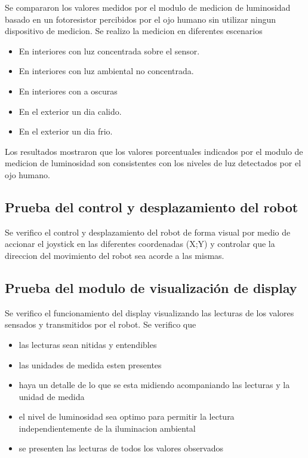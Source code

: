 Se compararon los valores medidos por el modulo de medicion de luminosidad basado en un fotoresistor percibidos por el ojo humano sin utilizar ningun dispositivo de medicion. Se realizo la medicion en diferentes escenarios

\begin{itemize}
	\item En interiores con luz concentrada sobre el sensor.
	\item En interiores con luz ambiental no concentrada.
	\item En interiores con a oscuras
	\item En el exterior un dia calido.
	\item En el exterior un dia frio.
\end{itemize}

Los resultados mostraron que los valores porcentuales indicados por el modulo de medicion de luminosidad son consistentes con los niveles de luz detectados por el ojo humano.

\subsection{Prueba del control y desplazamiento del robot}

Se verifico el control y desplazamiento del robot de forma visual por medio de accionar el joystick en las diferentes coordenadas (X;Y) y controlar que la direccion del movimiento del robot sea acorde a las mismas.


\subsection{Prueba del modulo de visualización de display}

Se verifico el funcionamiento del display visualizando las lecturas de los valores sensados y transmitidos por el robot. Se verifico que 

\begin{itemize}
	\item las lecturas sean nitidas y entendibles
	\item las unidades de medida esten presentes
	\item haya un detalle de lo que se esta midiendo acompaniando las lecturas y la unidad de medida
	\item el nivel de luminosidad sea optimo para permitir la lectura independientemente de la iluminacion ambiental
	\item se presenten las lecturas de todos los valores observados 
\end{itemize}


